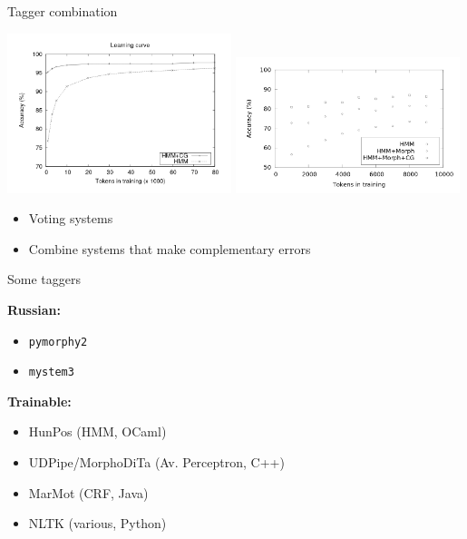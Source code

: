 \documentclass{beamer}
\begin{document}
\begin{frame}{Tagger combination}


\includegraphics[width=0.49\textwidth]{images/mans-huldren-tagger-chart.png}
\includegraphics[width=0.49\textwidth]{images/fran-rob-tagger-graph.png}

\begin{itemize}
  \item Voting systems 
  \item Combine systems that make complementary errors
\end{itemize}

\end{frame}


\begin{frame}{Some taggers}


\textbf{Russian:}
\begin{itemize}
  \item {\tt pymorphy2}
  \item {\tt mystem3}
\end{itemize}

\textbf{Trainable:}
\begin{itemize}
  \item HunPos (HMM, OCaml)
  \item UDPipe/MorphoDiTa (Av. Perceptron, C++)
  \item MarMot (CRF, Java)
  \item NLTK (various, Python)
\end{itemize}


\end{frame}
\end{document}
